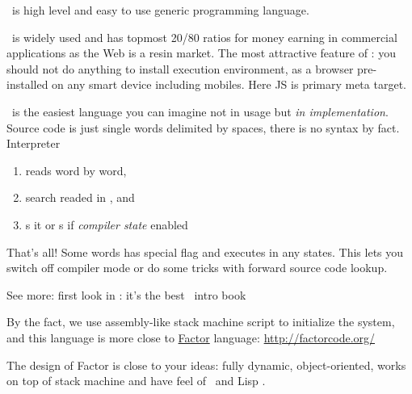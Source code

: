 \clearpage{}\secdown

\secrel{\py}\label{whyPython}

\py\ is high level and easy to use generic programming language.

\secrel{\js}

\js\ is widely used and has topmost 20/80 ratios for money earning in commercial
applications as the Web is a resin market. The most attractive feature of \js:
you should not do anything to install execution environment, as a browser
pre-installed on any smart device including mobiles. Here JS is primary meta
target.

\clearpage\secrel{\F}\label{whyFORTH}

\F\ is the easiest language you can imagine not in usage but \emph{in
implementation}. Source code is just single words delimited by spaces, there is
no syntax by fact.
% 
Interpreter
\begin{enumerate}[nosep]
  \item reads  word by word,
  \item search readed  in , and
  \item {}s it or s if \textit{compiler state} enabled
\end{enumerate}

\noindent
That's all! Some words has special  flag and executes in any states.
This lets you switch off compiler mode or do some tricks with forward source
code lookup.

\bigskip\noindent
See more: first look in \cite{kelly,kellyru}: it's the best \F\ intro book 

\secdown
{}

By the fact, we use assembly-like stack machine script to initialize the system,
and this language is more close to \href{http://factorcode.org/}{Factor}
language:
\url{http://factorcode.org/}

\bigskip\noindent
The design of Factor is close to your ideas: fully dynamic, object-oriented,
works on top of stack machine and have feel of \ST\ and Lisp
.

\secup

\secup